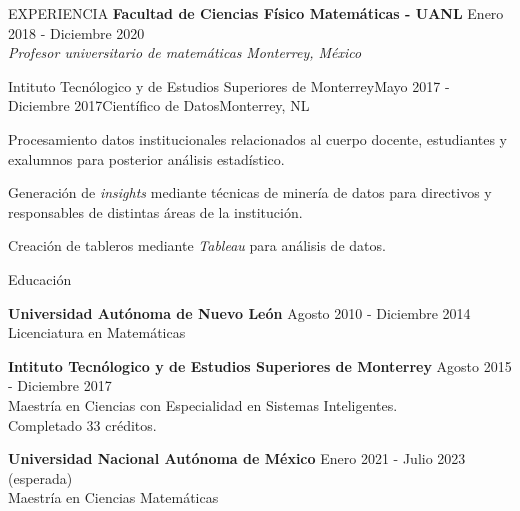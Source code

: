 \documentclass{resume} %
\begin{document}
\begin{rSection}{EXPERIENCIA}
{\bf Facultad de Ciencias Físico Matemáticas - UANL} \hfill {Enero 2018 - Diciembre 2020}\\{\em Profesor universitario de matemáticas} \hfill {\em Monterrey, México}

\begin{rSubsection}{ Intituto Tecnólogico y de Estudios Superiores de Monterrey}{Mayo 2017 - Diciembre 2017}{Científico de Datos}{Monterrey, NL}
\item Procesamiento datos institucionales relacionados al cuerpo docente, estudiantes y exalumnos para posterior análisis estadístico.
\item Generación de \textit{insights} mediante técnicas de minería de datos para directivos y responsables de distintas áreas de la institución.
\item Creación de tableros mediante \textit{Tableau} para análisis de datos.

\end{rSubsection}
\end{rSection} 

\begin{rSection}{Educación}

{\bf Universidad Autónoma de Nuevo León} \hfill {Agosto 2010 - Diciembre 2014}\\
Licenciatura en Matemáticas

{\bf Intituto Tecnólogico y de Estudios Superiores de Monterrey} \hfill {Agosto 2015 - Diciembre 2017} \\
Maestría en Ciencias con Especialidad en Sistemas Inteligentes.\\Completado 33 créditos.

{\bf Universidad Nacional Autónoma de México } \hfill {Enero 2021 - Julio 2023 (esperada)}\\
Maestría en Ciencias Matemáticas
\end{rSection}


\end{document}
